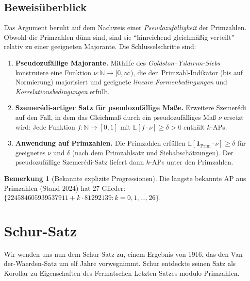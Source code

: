 \documentclass[12pt,a4paper]{amsart}
\theoremstyle{definition}
\newtheorem{remark}[theorem]{Bemerkung}
\newcommand{\N}{\mathbb{N}}
\begin{document}
\subsection{Beweisüberblick}

Das Argument beruht auf dem Nachweis einer \emph{Pseudozufälligkeit} der Primzahlen.
Obwohl die Primzahlen dünn sind, sind sie ``hinreichend gleichmäßig verteilt''
relativ zu einer geeigneten Majorante. Die Schlüsselschritte sind:

\begin{enumerate}[label=(\roman*)]
\item \textbf{Pseudozufällige Majorante.} Mithilfe des
  \emph{Goldston--Y\i ld\i r\i m-Siebs} konstruiere eine Funktion
  $\nu: \N \to [0,\infty)$, die den Primzahl-Indikator (bis auf Normierung) majorisiert
  und geeignete \emph{lineare Formenbedingungen} und
  \emph{Korrelationsbedingungen} erfüllt.

\item \textbf{Szemerédi-artiger Satz für pseudozufällige Maße.}
  Erweitere Szemerédi auf den Fall, in dem das Gleichmaß durch ein pseudozufälliges
  Maß $\nu$ ersetzt wird: Jede Funktion $f: \N \to [0,1]$ mit
  $\mathbb{E}[f \cdot \nu] \geq \delta > 0$ enthält $k$-APs.

\item \textbf{Anwendung auf Primzahlen.}
  Die Primzahlen erfüllen $\mathbb{E}[\mathbf{1}_{\mathrm{Prim}} \cdot \nu] \geq \delta$
  für geeignetes $\nu$ und $\delta$ (nach dem Primzahlsatz und Siebabschätzungen).
  Der pseudozufällige Szemerédi-Satz liefert dann $k$-APs unter den Primzahlen.
\end{enumerate}

\begin{remark}[Bekannte explizite Progressionen]
Die längste bekannte AP aus Primzahlen (Stand 2024) hat 27 Glieder:
$\{224584605939537911 + k \cdot 81292139 : k = 0, 1, \ldots, 26\}$.
\end{remark}

\section{Schur-Satz}\label{sec:schur}

Wir wenden uns nun dem Schur-Satz zu, einem Ergebnis von 1916, das den
Van-der-Waerden-Satz um elf Jahre vorwegnimmt. Schur entdeckte seinen Satz als
Korollar zu Eigenschaften des Fermatschen Letzten Satzes modulo Primzahlen.
\end{document}
